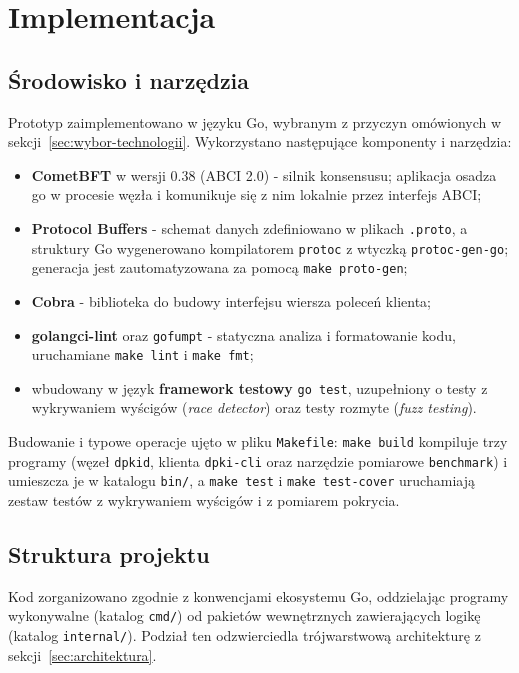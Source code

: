 \chapter{Implementacja}
\label{ch:implementacja}

\section{Środowisko i narzędzia}
\label{sec:srodowisko}

Prototyp zaimplementowano w języku Go, wybranym z przyczyn omówionych w sekcji~\ref{sec:wybor-technologii}. Wykorzystano następujące komponenty i narzędzia:
\begin{itemize}
    \item \textbf{CometBFT} w wersji 0.38 (ABCI 2.0) - silnik konsensusu; aplikacja osadza go w procesie węzła i komunikuje się z nim lokalnie przez interfejs ABCI;
    \item \textbf{Protocol Buffers} - schemat danych zdefiniowano w plikach \texttt{.proto}, a struktury Go wygenerowano kompilatorem \texttt{protoc} z wtyczką \texttt{protoc-gen-go}; generacja jest zautomatyzowana za pomocą \texttt{make proto-gen};
    \item \textbf{Cobra} - biblioteka do budowy interfejsu wiersza poleceń klienta;
    \item \textbf{golangci-lint} oraz \texttt{gofumpt} - statyczna analiza i formatowanie kodu, uruchamiane \texttt{make lint} i \texttt{make fmt};
    \item wbudowany w język \textbf{framework testowy} \texttt{go test}, uzupełniony o testy z wykrywaniem wyścigów (\emph{race detector}) oraz testy rozmyte (\emph{fuzz testing}).
\end{itemize}

Budowanie i typowe operacje ujęto w pliku \texttt{Makefile}: \texttt{make build} kompiluje trzy programy (węzeł \texttt{dpkid}, klienta \texttt{dpki-cli} oraz narzędzie pomiarowe \texttt{benchmark}) i umieszcza je w katalogu \texttt{bin/}, a \texttt{make test} i \texttt{make test-cover} uruchamiają zestaw testów z wykrywaniem wyścigów i z pomiarem pokrycia.

\section{Struktura projektu}
\label{sec:struktura-projektu}

Kod zorganizowano zgodnie z konwencjami ekosystemu Go, oddzielając programy wykonywalne (katalog \texttt{cmd/}) od pakietów wewnętrznych zawierających logikę (katalog \texttt{internal/}). Podział ten odzwierciedla trójwarstwową architekturę z sekcji~\ref{sec:architektura}.

